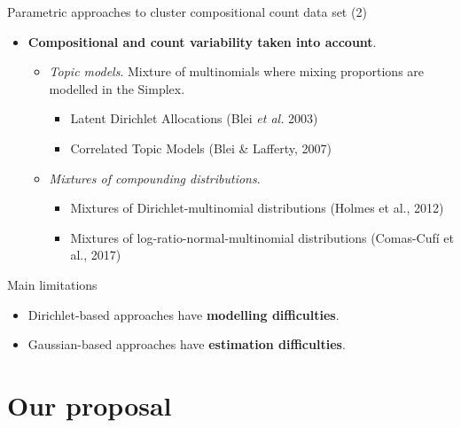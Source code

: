\documentclass[9pt]{beamer}
\begin{document}
\begin{frame}{Parametric approaches to cluster compositional count data set (2)}


\begin{itemize}
\item \textbf{{\color{green}Compositional} and {\color{green}count} variability taken into account}.\vspace{0.25cm}
\begin{itemize}
\item \textit{Topic models}. Mixture of multinomials where mixing proportions are modelled in the Simplex.\vspace{0.25cm}
\begin{itemize}
\item Latent Dirichlet Allocations (Blei \textit{et al.} 2003)
\item Correlated Topic Models (Blei \& Lafferty, 2007)
\end{itemize}\vspace{0.25cm}
\item \textit{Mixtures of compounding distributions}.\vspace{0.25cm}
\begin{itemize}
\item Mixtures of Dirichlet-multinomial distributions (Holmes et al., 2012)
\item Mixtures of log-ratio-normal-multinomial distributions (Comas-Cufí et al., 2017)
\end{itemize}
\end{itemize}
\end{itemize}

\pause
\begin{alertblock}{Main limitations}
\begin{itemize}
\item Dirichlet-based approaches have  \textbf{modelling difficulties}.
\item Gaussian-based approaches have  \textbf{estimation difficulties}.
\end{itemize}
\end{alertblock}

\end{frame}

\section{Our proposal}
\end{document}
